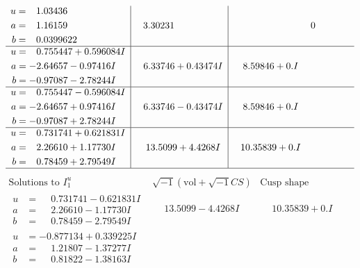 \documentclass[1p]{elsarticle_modified}
\theoremstyle{definition}
\newcommand{\I}{\sqrt{-1}}
\begin{document}
$$\begin{array}{c|c|c}
\begin{aligned}
u &= \phantom{-}1.03436\phantom{ +0.000000I} \\
a &= \phantom{-}1.16159\phantom{ +0.000000I} \\
b &= \phantom{-}0.0399622\phantom{ +0.000000I}\end{aligned}
 & \phantom{-}3.30231\phantom{ +0.000000I} & \phantom{-0.000000 } 0 \\ \hline\begin{aligned}
u &= \phantom{-}0.755447 + 0.596084 I \\
a &= -2.64657 - 0.97416 I \\
b &= -0.97087 - 2.78244 I\end{aligned}
 & \phantom{-}6.33746 + 0.43474 I & \phantom{-}8.59846 + 0. I\phantom{ +0.000000I} \\ \hline\begin{aligned}
u &= \phantom{-}0.755447 - 0.596084 I \\
a &= -2.64657 + 0.97416 I \\
b &= -0.97087 + 2.78244 I\end{aligned}
 & \phantom{-}6.33746 - 0.43474 I & \phantom{-}8.59846 + 0. I\phantom{ +0.000000I} \\ \hline\begin{aligned}
u &= \phantom{-}0.731741 + 0.621831 I \\
a &= \phantom{-}2.26610 + 1.17730 I \\
b &= \phantom{-}0.78459 + 2.79549 I\end{aligned}
 & \phantom{-}13.5099 + 4.4268 I & \phantom{-}10.35839 + 0. I\phantom{ +0.000000I}\\
 \hline 
 \end{array}$$\newpage$$\begin{array}{c|c|c}  
\text{Solutions to }I^u_{1}& \I (\text{vol} + \sqrt{-1}CS) & \text{Cusp shape}\\
 \hline 
\begin{aligned}
u &= \phantom{-}0.731741 - 0.621831 I \\
a &= \phantom{-}2.26610 - 1.17730 I \\
b &= \phantom{-}0.78459 - 2.79549 I\end{aligned}
 & \phantom{-}13.5099 - 4.4268 I & \phantom{-}10.35839 + 0. I\phantom{ +0.000000I} \\ \hline\begin{aligned}
u &= -0.877134 + 0.339225 I \\
a &= \phantom{-}1.21807 - 1.37277 I \\
b &= \phantom{-}0.81822 - 1.38163 I\end{aligned}

\end{array}$$
\end{document}
